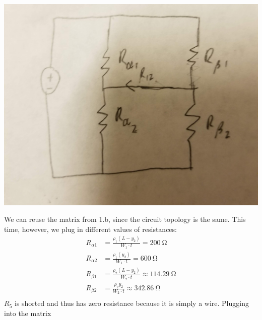 \documentclass[]{article}
\begin{document}
\subsection{}

\begin{center}
	\includegraphics[width=0.7\linewidth]{20191018_214635}
\end{center}
We can reuse the matrix from 1.b, since the circuit topology is the same. 
This time, however, we plug in different values of resistances: 
\begin{align}
	R_{\alpha 1} &= \frac{\rho_1 (L - y_2)}{W_1 \cdot t} = \SI{200}{\ohm} \\
	R_{\alpha 2} &= \frac{\rho_1 (y_2)}{W_1 \cdot t} = \SI{600}{\ohm} \\
	R_{\beta 1} &= \frac{\rho_2 (L - y_2)}{W_2 \cdot t} \approx \SI{114.29}{\ohm} \\
	R_{\beta 2} &= \frac{\rho_2 y_2}{W_2 \cdot t} \approx \SI{342.86}{\ohm} \\
\end{align}
\(R_5\) is shorted and thus has zero resistance because it is simply a wire. 
Plugging into the matrix
\end{document}
